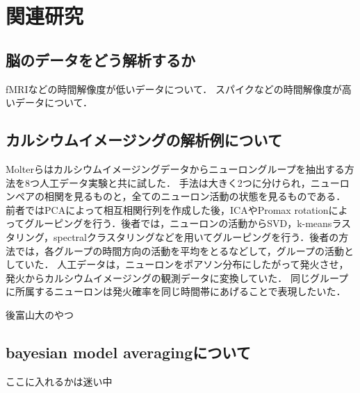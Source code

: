 \chapter{関連研究}
\section{脳のデータをどう解析するか}
fMRIなどの時間解像度が低いデータについて．
スパイクなどの時間解像度が高いデータについて．

\section{カルシウムイメージングの解析例について}
Molterらはカルシウムイメージングデータからニューロングループを抽出する方法を8つ人工データ実験と共に試した\cite{Molter2018}．
手法は大きく2つに分けられ，ニューロンペアの相関を見るものと，全てのニューロン活動の状態を見るものである．
前者ではPCAによって相互相関行列を作成した後，ICAやPromax rotationによってグルーピングを行う．後者では，ニューロンの活動からSVD，k-meansラスタリング，spectralクラスタリングなどを用いてグルーピングを行う．後者の方法では，各グループの時間方向の活動を平均をとるなどして，グループの活動としていた．
人工データは，ニューロンをポアソン分布にしたがって発火させ，発火からカルシウムイメージングの観測データに変換していた．
同じグループに所属するニューロンは発火確率を同じ時間帯にあげることで表現したいた．

後富山大のやつ

\section{bayesian model averagingについて}
ここに入れるかは迷い中
